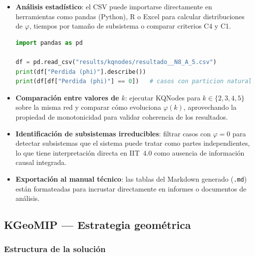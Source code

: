 \begin{itemize}
  \item \textbf{Análisis estadístico}: el CSV puede importarse directamente en
        herramientas como pandas (Python), R o Excel para calcular distribuciones
        de $\varphi$, tiempos por tamaño de subsistema o comparar criterios C4 y C1.

\begin{lstlisting}[language=Python]
import pandas as pd

df = pd.read_csv("results/kqnodes/resultado__N8_A_5.csv")
print(df["Perdida (phi)"].describe())
print(df[df["Perdida (phi)"] == 0])   # casos con particion natural
\end{lstlisting}

  \item \textbf{Comparación entre valores de $k$}: ejecutar KQNodes para
        $k \in \{2, 3, 4, 5\}$ sobre la misma red y comparar cómo evoluciona
        $\varphi(k)$, aprovechando la propiedad de monotonicidad para validar
        coherencia de los resultados.

  \item \textbf{Identificación de subsistemas irreducibles}: filtrar casos con
        $\varphi = 0$ para detectar subsistemas que el sistema puede tratar como
        partes independientes, lo que tiene interpretación directa en IIT~4.0
        como ausencia de información causal integrada.

  \item \textbf{Exportación al manual técnico}: las tablas del Markdown generado
        (\texttt{.md}) están formateadas para incrustar directamente en informes
        o documentos de análisis.
\end{itemize}

\subsection{KGeoMIP — Estrategia geométrica}
\label{sec:interpretacion_kgeomip}

\subsubsection{Estructura de la solución}

